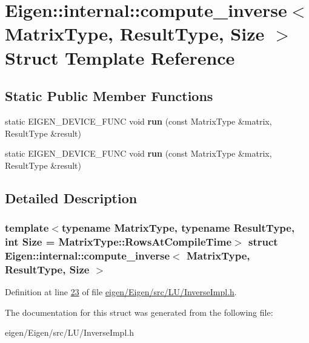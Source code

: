\hypertarget{struct_eigen_1_1internal_1_1compute__inverse}{}\section{Eigen\+:\+:internal\+:\+:compute\+\_\+inverse$<$ Matrix\+Type, Result\+Type, Size $>$ Struct Template Reference}
\label{struct_eigen_1_1internal_1_1compute__inverse}
\subsection*{Static Public Member Functions}
\begin{DoxyCompactItemize}
\item 
\mbox{\label{struct_eigen_1_1internal_1_1compute__inverse_ab3392d7cab242bdb510741c662dc01dd}} 
static E\+I\+G\+E\+N\+\_\+\+D\+E\+V\+I\+C\+E\+\_\+\+F\+U\+NC void {\bfseries run} (const Matrix\+Type \&matrix, Result\+Type \&result)
\item 
\mbox{\label{struct_eigen_1_1internal_1_1compute__inverse_ab3392d7cab242bdb510741c662dc01dd}} 
static E\+I\+G\+E\+N\+\_\+\+D\+E\+V\+I\+C\+E\+\_\+\+F\+U\+NC void {\bfseries run} (const Matrix\+Type \&matrix, Result\+Type \&result)
\end{DoxyCompactItemize}


\subsection{Detailed Description}
\subsubsection*{template$<$typename Matrix\+Type, typename Result\+Type, int Size = Matrix\+Type\+::\+Rows\+At\+Compile\+Time$>$\newline
struct Eigen\+::internal\+::compute\+\_\+inverse$<$ Matrix\+Type, Result\+Type, Size $>$}



Definition at line \hyperlink{eigen_2_eigen_2src_2_l_u_2_inverse_impl_8h_source_l00023}{23} of file \hyperlink{eigen_2_eigen_2src_2_l_u_2_inverse_impl_8h_source}{eigen/\+Eigen/src/\+L\+U/\+Inverse\+Impl.\+h}.



The documentation for this struct was generated from the following file\+:\begin{DoxyCompactItemize}
\item 
eigen/\+Eigen/src/\+L\+U/\+Inverse\+Impl.\+h\end{DoxyCompactItemize}
